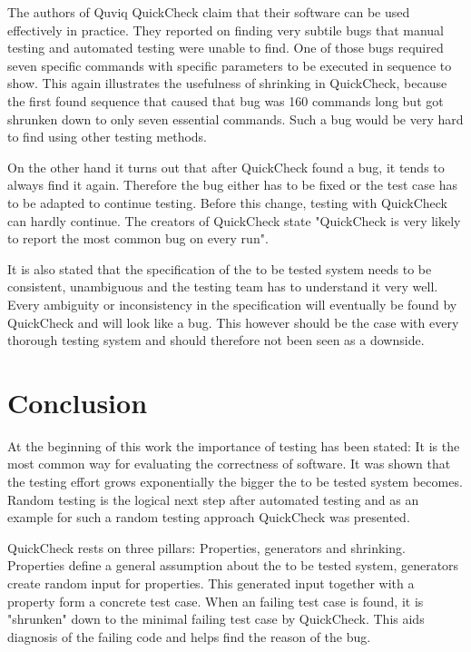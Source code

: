 \documentclass[a4paper, 12pt]{article} %
\begin{document}
The authors of Quviq QuickCheck claim that their software can be used effectively in practice. They reported on finding very subtile bugs that manual testing and automated testing were unable to find. One of those bugs required seven specific commands with specific parameters to be executed in sequence to show. This again illustrates the usefulness of shrinking in QuickCheck, because the first found sequence that caused that bug was 160 commands long but got shrunken down to only seven essential commands. Such a bug would be very hard to find using other testing methods. \cite{Arts06}

On the other hand it turns out that after QuickCheck found a bug, it tends to always find it again. Therefore the bug either has to be fixed or the test case has to be adapted to continue testing. Before this change, testing with QuickCheck can hardly continue. The creators of QuickCheck state "QuickCheck is very likely to report the most common bug on every run". \cite{Arts06}

It is also stated that the specification of the to be tested system needs to be consistent, unambiguous and the testing team has to understand it very well. Every ambiguity or inconsistency in the specification will eventually be found by QuickCheck and will look like a bug. This however should be the case with every thorough testing system and should therefore not been seen as a downside. \cite{Arts06}

\newpage
\section{Conclusion}


At the beginning of this work the importance of testing has been stated: It is the most common way for evaluating the correctness of software. It was shown that the testing effort grows exponentially the bigger the to be tested system becomes. Random testing is the logical next step after automated testing and as an example for such a random testing approach QuickCheck was presented.  


QuickCheck rests on three pillars: Properties, generators and shrinking. Properties define a general assumption about the to be tested system, generators create random input for properties. This generated input together with a property form a concrete test case. When an failing test case is found, it is "shrunken" down to the minimal failing test case by QuickCheck. This aids diagnosis of the failing code and helps find the reason of the bug. 
\end{document}
